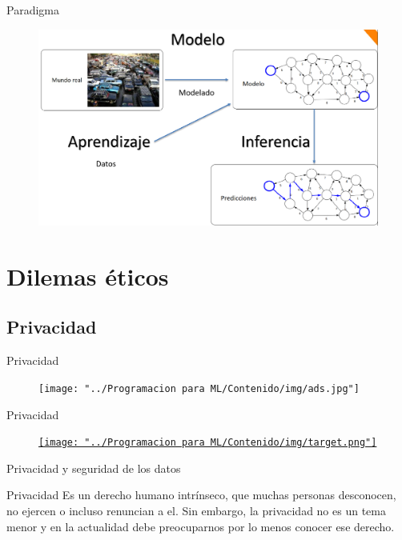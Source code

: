 \documentclass[11pt,aspectratio=169]{beamer}
\begin{document}
\begin{frame}{Paradigma}
    \begin{figure}
        \centering 
        \includegraphics[scale=0.25]{img/paradigma.png}
    \end{figure}
\end{frame}


\section[Ética]{Dilemas éticos}
\subsection{Privacidad}
\begin{frame}{Privacidad}
    \begin{figure}
        \centering
        \texttt{[image: "../Programacion para ML/Contenido/img/ads.jpg"]}
    \end{figure}
\end{frame}

\begin{frame}{Privacidad}
    \begin{figure}
        \centering
        \href{https://www.businessinsider.com/the-incredible-story-of-how-target-exposed-a-teen-girls-pregnancy-2012-2?r=MX&IR=T}{\texttt{[image: "../Programacion para ML/Contenido/img/target.png"]}}
    \end{figure}
\end{frame}

\begin{frame}{Privacidad y seguridad de los datos}
    \begin{block}{Privacidad}
    Es un derecho humano intrínseco, que muchas personas desconocen, no ejercen o incluso renuncian a el. Sin embargo, la 
    privacidad no es un tema menor y en la actualidad debe preocuparnos por lo menos conocer ese derecho.
    \end{block}
\end{frame}
    
\end{document}
